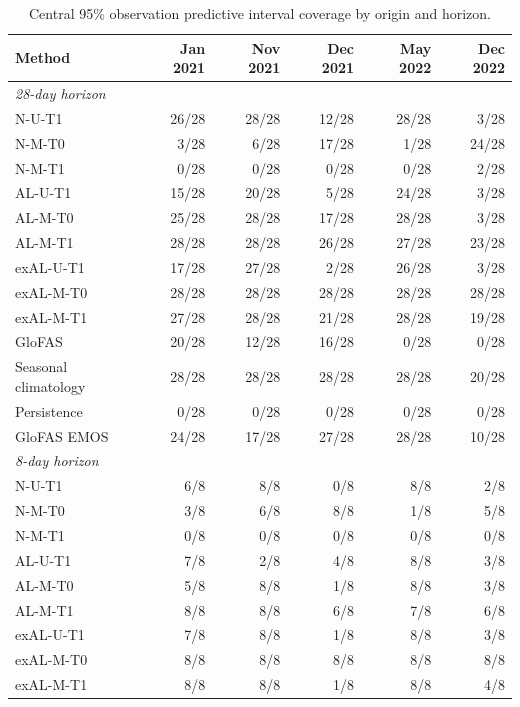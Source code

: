 \begin{table}[!htbp]
\centering
\begin{threeparttable}
\caption{Central 95\% observation predictive interval coverage by origin and horizon.}
\label{tab:no_refit_origin_coverage}
\fontsize{8.5}{10.5}\selectfont
\setlength{\tabcolsep}{4pt}
\begin{tabular}{lrrrrr}
\hline
Method & Jan 2021 & Nov 2021 & Dec 2021 & May 2022 & Dec 2022 \\
\hline
\multicolumn{6}{l}{\textit{28-day horizon}} \\
N-U-T1 & 26/28 & 28/28 & 12/28 & 28/28 & 3/28 \\
N-M-T0 & 3/28 & 6/28 & 17/28 & 1/28 & 24/28 \\
N-M-T1 & 0/28 & 0/28 & 0/28 & 0/28 & 2/28 \\
AL-U-T1 & 15/28 & 20/28 & 5/28 & 24/28 & 3/28 \\
AL-M-T0 & 25/28 & 28/28 & 17/28 & 28/28 & 3/28 \\
AL-M-T1 & 28/28 & 28/28 & 26/28 & 27/28 & 23/28 \\
exAL-U-T1 & 17/28 & 27/28 & 2/28 & 26/28 & 3/28 \\
exAL-M-T0 & 28/28 & 28/28 & 28/28 & 28/28 & 28/28 \\
exAL-M-T1 & 27/28 & 28/28 & 21/28 & 28/28 & 19/28 \\
GloFAS & 20/28 & 12/28 & 16/28 & 0/28 & 0/28 \\
Seasonal climatology & 28/28 & 28/28 & 28/28 & 28/28 & 20/28 \\
Persistence & 0/28 & 0/28 & 0/28 & 0/28 & 0/28 \\
GloFAS EMOS & 24/28 & 17/28 & 27/28 & 28/28 & 10/28 \\
\multicolumn{6}{l}{\textit{8-day horizon}} \\
N-U-T1 & 6/8 & 8/8 & 0/8 & 8/8 & 2/8 \\
N-M-T0 & 3/8 & 6/8 & 8/8 & 1/8 & 5/8 \\
N-M-T1 & 0/8 & 0/8 & 0/8 & 0/8 & 0/8 \\
AL-U-T1 & 7/8 & 2/8 & 4/8 & 8/8 & 3/8 \\
AL-M-T0 & 5/8 & 8/8 & 1/8 & 8/8 & 3/8 \\
AL-M-T1 & 8/8 & 8/8 & 6/8 & 7/8 & 6/8 \\
exAL-U-T1 & 7/8 & 8/8 & 1/8 & 8/8 & 3/8 \\
exAL-M-T0 & 8/8 & 8/8 & 8/8 & 8/8 & 8/8 \\
exAL-M-T1 & 8/8 & 8/8 & 1/8 & 8/8 & 4/8 \\

\end{tabular}
\end{threeparttable}
\end{table}
